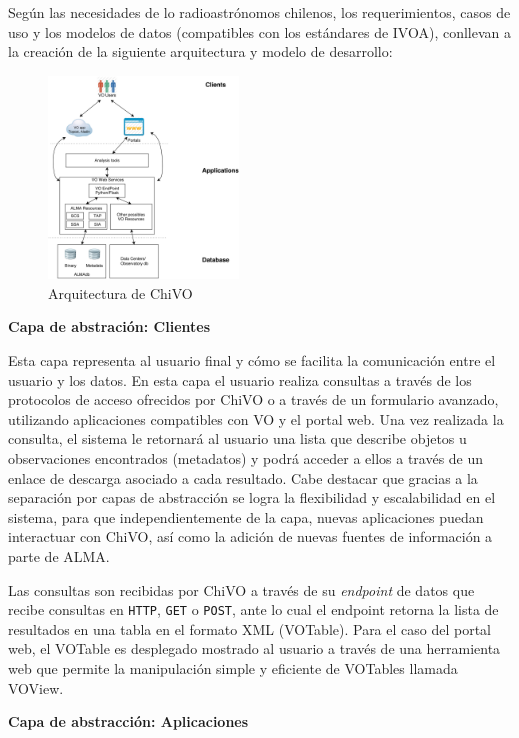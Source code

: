 Según las necesidades de lo radioastrónomos chilenos, los requerimientos, casos de
uso  y los modelos de datos (compatibles con los estándares de IVOA),
conllevan a la creación de la siguiente arquitectura y modelo de desarrollo:

\begin{figure}[ht]
    \centering
    \includegraphics[width=0.45\textwidth]{images/chivo_capas.png}
    \caption{Arquitectura de ChiVO}
    \label{fig:chivoarch}
\end{figure}

\textbf{Capa de abstración: Clientes}

Esta capa representa al usuario final y cómo se facilita la comunicación entre el
usuario y los datos.
En esta capa el usuario realiza consultas a través de los protocolos de acceso
ofrecidos por ChiVO o a través de un formulario avanzado, utilizando aplicaciones
compatibles con VO y el portal web.
Una vez realizada la consulta, el sistema le retornará al usuario una lista que
describe objetos u observaciones encontrados (metadatos) y podrá acceder a ellos a
través de un enlace de descarga asociado a cada resultado.
Cabe destacar que gracias a la separación por capas de abstracción se logra la
flexibilidad y escalabilidad en el sistema, para que independientemente de la capa,
nuevas aplicaciones puedan interactuar con ChiVO, así como la adición de nuevas
fuentes de información a parte de ALMA.

Las consultas son recibidas por ChiVO a través de su \emph{endpoint} de datos que
recibe consultas en \texttt{HTTP}, \texttt{GET} o \texttt{POST}, ante lo cual el
endpoint retorna la lista de resultados en una tabla en el formato XML (VOTable).
Para el caso del portal web, el VOTable es desplegado mostrado al usuario a través
de una herramienta web que permite la manipulación simple y eficiente de VOTables
llamada VOView.

\textbf{Capa de abstracción: Aplicaciones}

